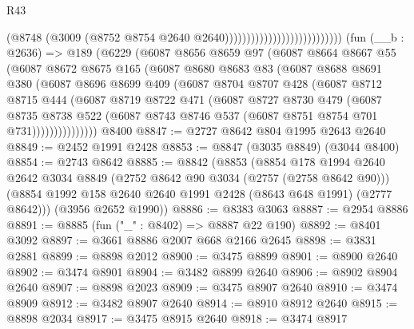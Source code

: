 \begin{lexlean}{R43}
\begin{coremodule}
                                                    (@8748
                                                      (@3009
                                                        (@8752
                                                          @8754
                                                          @2640
                                                          @2640)))))))))))))))))))))))))))
    (fun (__b : @2636) =>
    @189
      (@6229
        (@6087
          @8656
          @8659
          @97
          (@6087
            @8664
            @8667
            @55
            (@6087
              @8672
              @8675
              @165
              (@6087
                @8680
                @8683
                @83
                (@6087
                  @8688
                  @8691
                  @380
                  (@6087
                    @8696
                    @8699
                    @409
                    (@6087
                      @8704
                      @8707
                      @428
                      (@6087
                        @8712
                        @8715
                        @444
                        (@6087
                          @8719
                          @8722
                          @471
                          (@6087
                            @8727
                            @8730
                            @479
                            (@6087
                              @8735
                              @8738
                              @522
                              (@6087 @8743 @8746 @537 (@6087 @8751 @8754 @701 @731)))))))))))))))
    @8400
@8847 := @2727 @8642 @804 @1995 @2643 @2640
@8849 := @2452 @1991 @2428
@8853 := @8847 (@3035 @8849) (@3044 @8400)
@8854 := @2743 @8642
@8885 := @8842
    (@8853
      (@8854
        @178
        @1994
        @2640
        @2642
        @3034
        @8849
        (@2752 @8642 @90 @3034 (@2757 (@2758 @8642 @90)))
        (@8854 @1992 @158 @2640 @2640 @1991 @2428 (@8643 @648 @1991) (@2777 @8642)))
      (@3956 @2652 @1990))
@8886 := @8383 @3063
@8887 := @2954 @8886
@8891 := @8885 (fun ("_" : @8402) => @8887 @22 @190)
@8892 := @8401 @3092
@8897 := @3661 @8886 @2007 @668 @2166 @2645
@8898 := @3831 @2881
@8899 := @8898 @2012
@8900 := @3475 @8899
@8901 := @8900 @2640
@8902 := @3474 @8901
@8904 := @3482 @8899 @2640
@8906 := @8902 @8904 @2640
@8907 := @8898 @2023
@8909 := @3475 @8907 @2640
@8910 := @3474 @8909
@8912 := @3482 @8907 @2640
@8914 := @8910 @8912 @2640
@8915 := @8898 @2034
@8917 := @3475 @8915 @2640
@8918 := @3474 @8917

\end{coremodule}
\end{lexlean}
